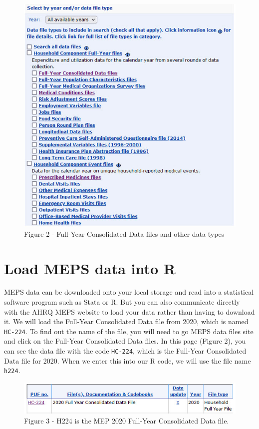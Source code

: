 \documentclass[
]{book}
\theoremstyle{definition}
\theoremstyle{definition}
\theoremstyle{definition}
\theoremstyle{definition}
\theoremstyle{remark}
\begin{document}
\begin{figure}
\includegraphics[width=1\linewidth]{Figure 2} \caption{Figure 2 - Full-Year Consolidated Data files and other data types}\label{fig:unnamed-chunk-3}
\end{figure}

\hypertarget{load-meps-data-into-r}{%
\section{Load MEPS data into R}\label{load-meps-data-into-r}}

MEPS data can be downloaded onto your local storage and read into a statistical software program such as Stata or R. But you can also communicate directly with the AHRQ MEPS website to load your data rather than having to download it. We will load the Full-Year Consolidated Data file from 2020, which is named \texttt{HC-224}. To find out the name of the file, you will need to go MEPS data files site and click on the Full-Year Consolidated Data files. In this page (Figure 2), you can see the data file with the code \texttt{HC-224}, which is the Full-Year Consolidated Data file for 2020. When we enter this into our R code, we will use the file name \texttt{h224}.

\begin{figure}
\includegraphics[width=1\linewidth]{Figure 3} \caption{Figure 3 - H224 is the MEP 2020 Full-Year Consolidated Data file.}\label{fig:unnamed-chunk-4}
\end{figure}
\end{document}
